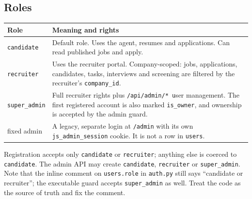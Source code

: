 \documentclass[11pt,a4paper]{article}
\newcommand{\file}[1]{\texttt{\small #1}}
\newcommand{\code}[1]{\texttt{#1}}
\newcommand{\api}[2]{\texttt{\small #1\,#2}}
\begin{document}
\subsection{Roles}
\begin{center}
\begin{tabular}{@{}lp{11.4cm}@{}}
\toprule
\textbf{Role} & \textbf{Meaning and rights}\\
\midrule
\code{candidate} & Default role. Uses the agent, resumes and applications.
  Can read published jobs and apply.\\
\code{recruiter} & Uses the recruiter portal. Company-scoped: jobs,
  applications, candidates, tasks, interviews and screening are filtered by
  the recruiter's \code{company\_id}.\\
\code{super\_admin} & Full recruiter rights plus \api{/api/admin/*} user
  management. The first registered account is also marked
  \code{is\_owner}, and ownership is accepted by the admin guard.\\
fixed admin & A legacy, separate login at \file{/admin} with its own
  \code{js\_admin\_session} cookie. It is not a row in \code{users}.\\
\bottomrule
\end{tabular}
\end{center}

Registration accepts only \code{candidate} or \code{recruiter}; anything else
is coerced to \code{candidate}. The admin API may create
\code{candidate}, \code{recruiter} or \code{super\_admin}. Note that the
inline comment on \code{users.role} in \file{auth.py} still says
``candidate or recruiter''; the executable guard accepts
\code{super\_admin} as well. Treat the code as the source of truth and fix the
comment.
\end{document}
